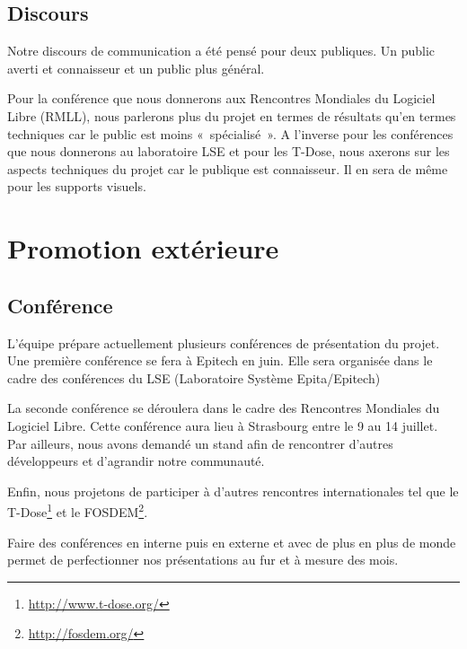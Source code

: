 \documentclass[francais]{rtxreport}
\begin{document}
\section{Discours}

Notre discours de communication a été pensé pour deux publiques. Un public
averti et connaisseur et un public plus général.

Pour la conférence que nous donnerons aux Rencontres Mondiales du Logiciel
Libre (RMLL), nous parlerons plus du projet en termes de résultats qu'en termes
techniques car le public est moins «~spécialisé~». A l'inverse pour les
conférences que nous donnerons au laboratoire LSE et pour les T-Dose, nous
axerons sur les aspects techniques du projet car le publique est connaisseur.
Il en sera de même pour les supports visuels.




\chapter{Promotion extérieure}



\section{Conférence}

L'équipe prépare actuellement plusieurs conférences de présentation du projet.
Une première conférence se fera à Epitech en juin. Elle sera organisée dans le
cadre des conférences du LSE (Laboratoire Système Epita/Epitech)

La seconde conférence se déroulera dans le cadre des Rencontres Mondiales du
Logiciel Libre. Cette conférence aura lieu à Strasbourg entre le 9 au 14
juillet. Par ailleurs, nous avons demandé un stand afin de rencontrer d'autres
développeurs et d'agrandir notre communauté.

Enfin, nous projetons de participer à d'autres rencontres internationales tel
que le T-Dose\footnote{\url{http://www.t-dose.org/}} et le FOSDEM\footnote{\url{http://fosdem.org/}}.

Faire des conférences en interne puis en externe et avec de plus en plus de
monde permet de perfectionner nos présentations au fur et à mesure des mois. %
\end{document}
